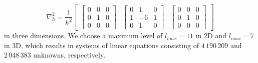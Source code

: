 \begin{equation*}
\nabla^2_h = 
\frac{1}{h^2} \begin{bmatrix}
	\begin{bmatrix}
	0 & 0 & 0 \\
	0 & 1 & 0 \\
	0 & 0 & 0
	\end{bmatrix}
	&		
	\begin{bmatrix}
	0 & 1 & 0 \\
	1 & -6 & 1 \\
	0 & 1 & 0 
	\end{bmatrix} &
	\begin{bmatrix}
	0 & 0 & 0 \\
	0 & 1 & 0 \\
	0 & 0 & 0
\end{bmatrix}
\end{bmatrix}
\end{equation*} in three dimensions.
We choose a maximum level of $l_{max} = 11$ in 2D and $l_{max} = 7$ in 3D, which results in systems of linear equations consisting of $4\,190\,209$ and $2\,048\,383$ unknowns, respectively.


